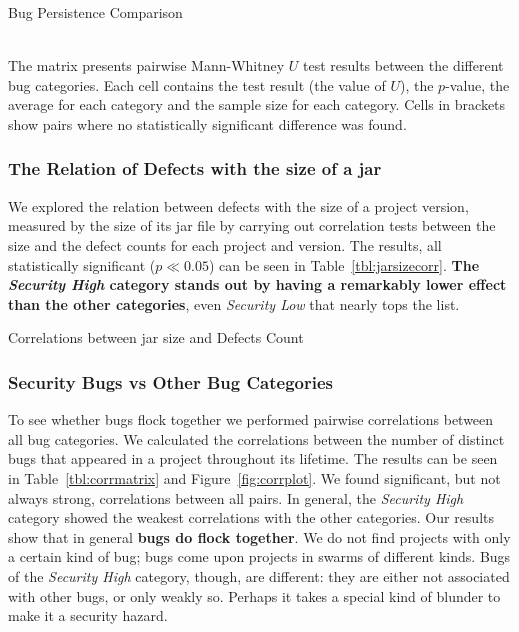 \documentclass[conference]{llncs}
\begin{document}
\begin{landscape}
  \begin{table}
    \setlength{\extrarowheight}{0.10cm}
    \caption{Bug Persistence Comparison}
    \label{tbl:bug_persistence}
    \resizebox{0.95\columnwidth}{!}{
    }\\
    The matrix presents pairwise Mann-Whitney $U$ test results
    between the different bug categories. Each cell contains the test
    result (the value of $U$), the $p$-value, the average for each
    category and the sample size for each category. Cells in brackets show
    pairs where no statistically significant difference was found.
  \end{table}
\end{landscape}

\subsubsection{The Relation of Defects with the size of a {\sc jar}}

We explored the relation between defects with the size of a project
version, measured by the size of its {\sc jar} file by carrying out
correlation tests between the size and the defect counts for each
project and version. The results, all statistically significant ($p
\ll 0.05$) can be seen in Table~\ref{tbl:jarsizecorr}.  \textbf{The {\it
  Security High} category stands out by having a remarkably lower
effect than the other categories}, even {\it Security Low} that nearly
tops the list.

\begin{table}[t]
    \centering
    \caption{Correlations between {\sc jar} size and Defects Count}
    \label{tbl:jarsizecorr}
    
\end{table}

\subsubsection{Security Bugs {\sc vs} Other Bug Categories}

To see whether bugs flock together we performed pairwise correlations
between all bug categories. We calculated the correlations between the
number of distinct bugs that appeared in a project throughout its
lifetime. The results can be seen in Table~\ref{tbl:corrmatrix} and
Figure~\ref{fig:corrplot}. We found significant, but not always
strong, correlations between all pairs. In general, the {\it Security
  High} category showed the weakest correlations with the other
categories. Our results show that in general \textbf{bugs do flock together}.
We do not find projects with only a certain kind of bug; bugs come
upon projects in swarms of different kinds. Bugs of the {\it Security
  High} category, though, are different: they are either not
associated with other bugs, or only weakly so. Perhaps it takes a
special kind of blunder to make it a security hazard.
\end{document}
